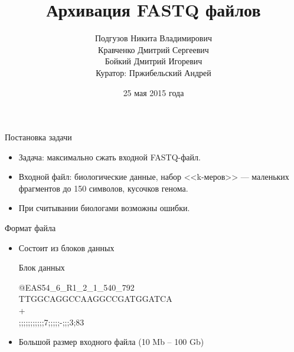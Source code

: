 \documentclass[12pt]{beamer}
\begin{document}
\title{Архивация FASTQ файлов}

\author[]{
    Подгузов Никита Владимирович \\
    Кравченко Дмитрий Сергеевич \\
    Бойкий Дмитрий Игоревич \\ 
    \vspace{\baselineskip}
    \footnotesize Куратор: Пржибельский Андрей 
}
\date{25 мая 2015 года}

\frame{\titlepage}

\begin{frame}{Постановка задачи}

    \begin{itemize}

        \item <1-> Задача: максимально сжать входной FASTQ-файл.
        
        \item <2-> Входной файл: биологические данные, набор <<k-меров>> --- маленьких фрагментов до 150 символов, кусочков генома. 

        \item <3-> При считывании биологами возможны ошибки.

    \end{itemize}

\end{frame}

\begin{frame}{Формат файла}

    \begin{itemize}

        \item <1-> Состоит из блоков данных

        \begin{block}{Блок данных}
    
            @EAS54{\_}6{\_}R1{\_}2{\_}1{\_}540{\_}792\\
            TTGGCAGGCCAAGGCCGATGGATCA\\
            + \\
            ;;;;;;;;;;;7;;;;;-;;;3;83 

        \end{block}
    
        \item <2-> Большой размер входного файла (10 Mb -- 100 Gb)

    \end{itemize}

\end{frame}
\end{document}
